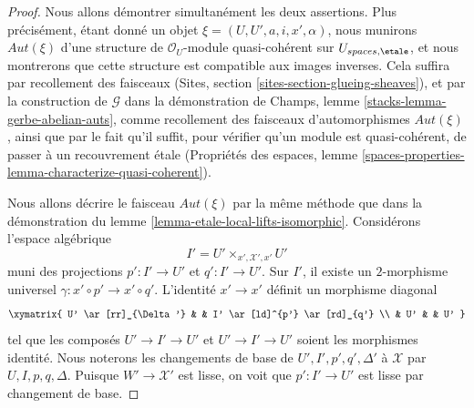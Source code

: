 \begin{proof}
Nous allons démontrer simultanément les deux assertions. Plus précisément, étant donné
un objet $\xi = (U, U', a, i, x', \alpha)$, nous munirons
$\mathit{Aut}(\xi)$ d'une structure de
$\mathcal{O}_U$-module quasi-cohérent sur $U_{spaces, \etale}$,
et nous montrerons que cette structure est compatible aux images inverses.
Cela suffira par recollement des faisceaux
(Sites, section \ref{sites-section-glueing-sheaves}),
et par la construction de $\mathcal{G}$ dans la démonstration de
Champs, lemme \ref{stacks-lemma-gerbe-abelian-auts},
comme recollement des faisceaux d'automorphismes $\mathit{Aut}(\xi)$,
ainsi que par le fait qu'il suffit, pour vérifier qu'un module est
quasi-cohérent, de passer à un recouvrement \'etale
(Propriétés des espaces, lemme
\ref{spaces-properties-lemma-characterize-quasi-coherent}).

\medskip\noindent
Nous allons décrire le faisceau $\mathit{Aut}(\xi)$ par la
même méthode que dans la démonstration du
lemme \ref{lemma-etale-local-lifts-isomorphic}.
Considérons l'espace algébrique
$$
I' = U' \times_{x', \mathcal{X}', x'} U'
$$
muni des projections $p' : I' \to U'$ et $q' : I' \to U'$.
Sur $I'$, il existe un $2$-morphisme universel
$\gamma : x' \circ p' \to x' \circ q'$.
L'identité $x' \to x'$ définit un morphisme diagonal
$$
\xymatrix{
U' \ar[rr]_{\Delta'} & & I' \ar[ld]^{p'} \ar[rd]_{q'} \\
& U' & & U'
}
$$
tel que les composés $U' \to I' \to U'$ et $U' \to I' \to U'$
soient les morphismes identité. Nous noterons les changements de base de
$U', I', p', q', \Delta'$ à $\mathcal{X}$ par $U, I, p, q, \Delta$.
Puisque $W' \to \mathcal{X}'$ est lisse, on voit que $p' : I' \to U'$
est lisse par changement de base.


\end{proof}
